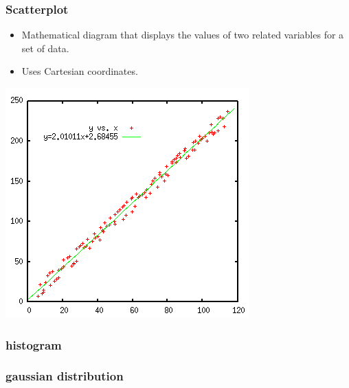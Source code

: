 \documentclass{beamer}
\begin{document}
\begin{frame}

\frametitle{Scatterplot}
\begin{itemize}
\item Mathematical diagram that displays the values of two related variables for a set of data.
\item Uses Cartesian coordinates.
\end{itemize}
\begin{center}
\includegraphics[scale=0.1]{scatterpot1}
\end{center}

\end{frame}

\begin{frame}
\frametitle{histogram}
\end{frame}

\begin{frame}
\frametitle{gaussian distribution}
\end{frame}
\end{document}
